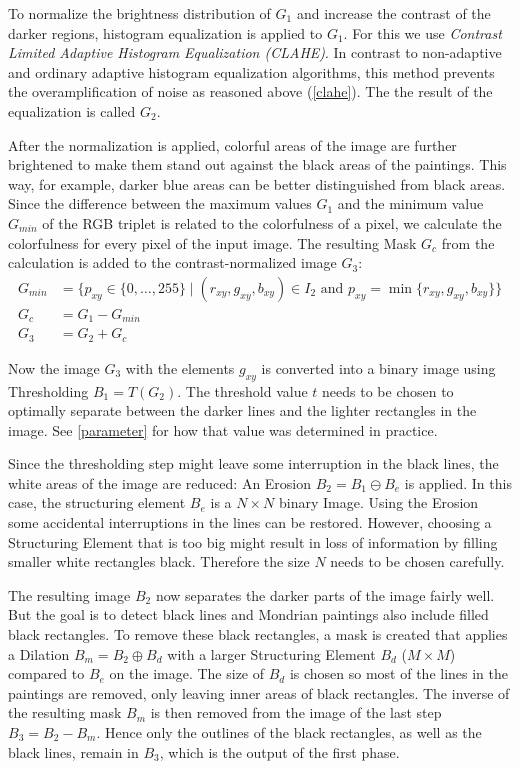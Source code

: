 \documentclass[serif,article,noparskip]{agse-thesis}
\begin{document}
To normalize the brightness distribution of $G_1$ and increase the contrast of
the darker regions, histogram equalization is applied to $G_1$. For this we
use \textit{Contrast Limited Adaptive Histogram Equalization (CLAHE)}. In
contrast to non-adaptive and ordinary adaptive histogram equalization
algorithms, this method prevents the overamplification of noise as reasoned
above (\ref{clahe}). The the result of the equalization is called $G_2$. \cite{Pizer1987}

After the normalization is applied, colorful areas of the image are further
brightened to make them stand out against the black areas of the paintings. This
way, for example, darker blue areas can be better distinguished from black
areas. Since the difference between the maximum values $G_1$ and the minimum
value $G_{min}$ of the RGB triplet is related to the colorfulness of a pixel, we
calculate the colorfulness for every pixel of the input image. The resulting
Mask $G_c$ from the calculation is added to the contrast-normalized image
$G_3$:
\begin{align}
G_{min} &= \{p_{xy} \in \{0,\ldots,255\} \mid (r_{xy},g_{xy},b_{xy})\in I_2\text{ and }p_{xy}=\min\{r_{xy},g_{xy},b_{xy}\}\}\\
G_c &= G_1 - G_{min}\\
G_3 &= G_2 + G_c
\end{align}

Now the image $G_3$ with the elements $g_{xy}$ is converted into a binary image
using Thresholding $B_1 = T(G_2)$. The threshold value $t$ needs to be chosen to
optimally separate between the darker lines and the lighter rectangles in the
image. See \ref{parameter} for how that value was determined in practice.

Since the thresholding step might leave some interruption in the black lines,
the white areas of the image are reduced: An Erosion $B_2 = B_1 \ominus B_e$ is
applied. In this case, the structuring element $B_e$ is a $N\times N$ binary
Image. Using the Erosion some accidental interruptions in the lines can be
restored. However, choosing a Structuring Element that is too big might result
in loss of information by filling smaller white rectangles black. Therefore the
size $N$ needs to be chosen carefully.

The resulting image $B_2$ now separates the darker parts of the image fairly
well. But the goal is to detect black lines and Mondrian paintings also include
filled black rectangles. To remove these black rectangles, a mask is created
that applies a Dilation $B_m = B_2 \oplus B_d$ with a larger Structuring Element
$B_d$ ($M\times M$) compared to $B_e$ on the image. The size of $B_d$ is chosen
so most of the lines in the paintings are removed, only leaving inner areas of
black rectangles. The inverse of the resulting mask $B_m$ is then removed from
the image of the last step $B_3 = B_2 - B_m$. Hence only the outlines of the
black rectangles, as well as the black lines, remain in $B_3$, which is the
output of the first phase.
\end{document}
